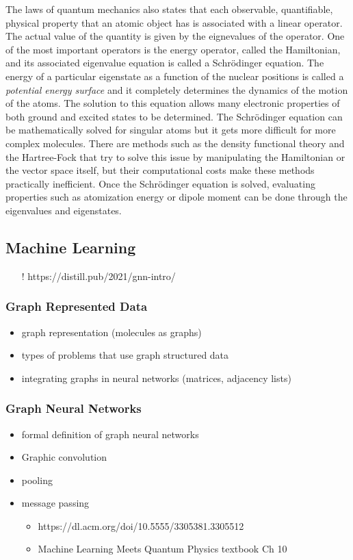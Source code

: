 \documentclass[12pt]{scrartcl}
\begin{document}
The laws of quantum mechanics also states that each observable, quantifiable, physical property that 
an atomic object has is associated with a linear operator. The actual value of the quantity is given 
by the eignevalues of the operator. One of the most important operators is the energy operator, called 
the Hamiltonian, and its associated eigenvalue equation is called a Schrödinger equation. The energy of 
a particular eigenstate as a function of the nuclear positions is called a \emph{potential energy surface}
and it completely determines the dynamics of the motion of the atoms. The solution to this equation 
allows many electronic properties of both ground and excited states to be determined. The Schrödinger 
equation can be mathematically solved for singular atoms but it gets more difficult for more complex molecules. 
There are methods such as the density functional theory and the Hartree-Fock that try to 
solve this issue by manipulating the Hamiltonian or the vector space itself, but their computational 
costs make these methods practically inefficient. Once the Schrödinger equation is solved, evaluating 
properties such as atomization energy or dipole moment can be done through the eigenvalues and eigenstates.


\newpage


\subsection{Machine Learning}
\begin{itemize}
    \item[!] https://distill.pub/2021/gnn-intro/
\end{itemize}
\subsubsection{Graph Represented Data}
\begin{itemize}
    \item graph representation (molecules as graphs)
    \item types of problems that use graph structured data 
    \item integrating graphs in neural networks (matrices, adjacency lists)
\end{itemize}
\subsubsection{Graph Neural Networks}    
\begin{itemize}
    \item formal definition of graph neural networks
    \item Graphic convolution
    \item pooling
    \item message passing
    \begin{itemize}
        \item https://dl.acm.org/doi/10.5555/3305381.3305512
        \item Machine Learning Meets Quantum Physics textbook Ch 10
    \end{itemize}
\end{itemize}
\end{document}
